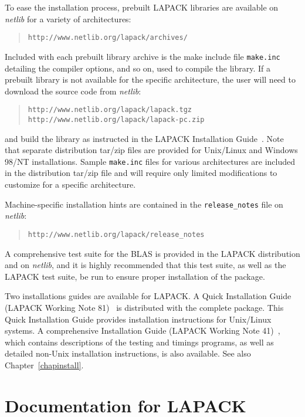 To ease the installation process, prebuilt LAPACK libraries
are available on {\em netlib} for a variety of architectures:
\begin{quote}
{\tt http://www.netlib.org/lapack/archives/}
\end{quote}
Included with each prebuilt library archive is the make include
file {\tt make.inc} detailing the compiler options, and so on, used
to compile the library.
If a prebuilt library is not available for the specific architecture,
the user will need to download the source code from {\em netlib}:
\begin{quote}
{\tt http://www.netlib.org/lapack/lapack.tgz} \\
{\tt http://www.netlib.org/lapack/lapack-pc.zip}
\end{quote}
and build the library as instructed in the LAPACK Installation
Guide~\cite{lawn41,lawn81}.  Note that separate distribution tar/zip files
are provided for Unix/Linux and Windows 98/NT installations.
Sample {\tt make.inc} files for various
architectures are included in the distribution tar/zip file and will
require only limited modifications to customize for a specific
architecture.

Machine-specific installation hints are contained in the {\tt release\_notes}
file on {\em netlib}:
\begin{quote}
{\tt http://www.netlib.org/lapack/release\_notes}
\end{quote}

A comprehensive test suite for the BLAS is provided in the LAPACK distribution and on
{\em netlib}, and it is highly recommended that this test suite, as well
as the LAPACK test suite, be run to ensure proper installation of the package.

Two installations guides are available for LAPACK.
A Quick Installation Guide (LAPACK Working Note 81)~\cite{lawn81} is
distributed with the complete package.  This Quick Installation Guide
provides installation instructions for Unix/Linux systems.  A comprehensive
Installation Guide (LAPACK Working Note 41)~\cite{lawn41}, which contains
descriptions of the testing and timings programs, as well as detailed non-Unix
installation instructions, is also available.
See also Chapter~\ref{chapinstall}.

\section{Documentation for LAPACK}\label{documentation}


